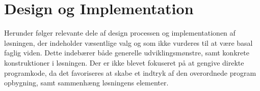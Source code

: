 \chapter{Design og Implementation}

Herunder følger relevante dele af design processen og implementationen af løsningen, der indeholder væsentlige valg og som ikke vurderes til at være basal faglig viden. Dette indebærer både generelle udviklingsmønstre, samt konkrete konstruktioner i løsningen. Der er ikke blevet fokuseret på at gengive direkte programkode, da det favoriseres at skabe et indtryk af den overordnede program opbygning, samt sammenhæng løsningens elementer.





